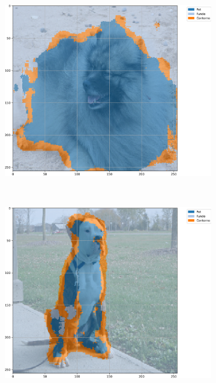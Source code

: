 \begin{figure}[H]
    \centering
    \caption[Segmentação com U-Net-\textit{Like}, \textit{Max Pooling}, 500 épocas, \textit{Oxford-IIIT Pets}, acurácia.]{Exemplos segmentados a partir de U-Net-\textit{Like} com \textit{Max Pooling} e 500 épocas no conjunto de dados \textit{Oxford-IIIT Pets} baseada em acurácia.}
    \label{results:fig:semantic:11}
     \begin{subfigure}[t]{0.32\textwidth}
         \centering
         \includegraphics[width=1\linewidth]{recursos/imagens/results/max_acc_unetlike500_image_0_overlayed_segmentation.png}
         \label{results:fig:semantic:11.1}
     \end{subfigure}%
     ~ 
     \begin{subfigure}[t]{0.32\textwidth}
         \centering
         \includegraphics[width=1\linewidth]{recursos/imagens/results/max_acc_unetlike500_image_1_overlayed_segmentation.png}

\end{subfigure}
\end{figure}
